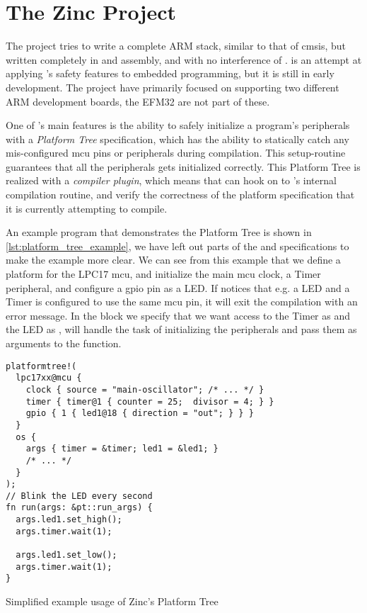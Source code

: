 
\section{The Zinc Project} %
\label{sec:zinc}

The {\zinc} \cite{web:zinc} project tries to write a complete ARM stack, similar to that of \gls{cmsis}, but written completely in {\rust} and assembly, and with no interference of {\C}.
{\zinc} is an attempt at applying {\rust}'s safety features to embedded programming, but it is still in early development.
The project have primarily focused on supporting two different ARM development boards, the EFM32 are not part of these.

One of {\zinc}'s main features is the ability to safely initialize a program's peripherals with a \emph{Platform Tree} specification, which has the ability to statically catch any mis-configured \gls{mcu} pins or peripherals during compilation.
This setup-routine guarantees that all the peripherals gets initialized correctly.
This Platform Tree is realized with a {\rust} \emph{compiler plugin}, which means that {\zinc} can hook on to {\rustc}'s internal compilation routine, and verify the correctness of the platform specification that it is currently attempting to compile.

An example program that demonstrates the Platform Tree is shown in \autoref{lst:platform_tree_example}, we have left out parts of the  and  specifications to make the example more clear.
We can see from this example that we define a platform for the LPC17 \gls{mcu}, and initialize the main \gls{mcu} clock, a Timer peripheral, and configure a \gls{gpio} pin as a LED.
If {\zinc} notices that e.g. a LED and a Timer is configured to use the same \gls{mcu} pin, it will exit the compilation with an error message.
In the  block we specify that we want access to the Timer as  and the LED as , {\zinc} will handle the task of initializing the peripherals and pass them as arguments to the  function.

\begin{listing}[H]
  \begin{verbatim}
platformtree!(
  lpc17xx@mcu {
    clock { source = "main-oscillator"; /* ... */ }
    timer { timer@1 { counter = 25;  divisor = 4; } }
    gpio { 1 { led1@18 { direction = "out"; } } }
  }
  os {
    args { timer = &timer; led1 = &led1; }
    /* ... */
  }
);
// Blink the LED every second
fn run(args: &pt::run_args) {
  args.led1.set_high();
  args.timer.wait(1);

  args.led1.set_low();
  args.timer.wait(1);
}
  \end{verbatim}
  \caption{Simplified example usage of Zinc's Platform Tree}
  \label{lst:platform_tree_example}
\end{listing}

